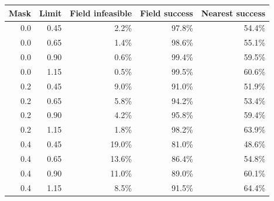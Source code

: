 \begin{tabular}{rrrrr}\toprule
Mask & Limit & Field infeasible & Field success & Nearest success\\
\midrule
0.0 & 0.45 & 2.2\% & 97.8\% & 54.4\%\\
0.0 & 0.65 & 1.4\% & 98.6\% & 55.1\%\\
0.0 & 0.90 & 0.6\% & 99.4\% & 59.5\%\\
0.0 & 1.15 & 0.5\% & 99.5\% & 60.6\%\\
0.2 & 0.45 & 9.0\% & 91.0\% & 51.9\%\\
0.2 & 0.65 & 5.8\% & 94.2\% & 53.4\%\\
0.2 & 0.90 & 4.2\% & 95.8\% & 59.4\%\\
0.2 & 1.15 & 1.8\% & 98.2\% & 63.9\%\\
0.4 & 0.45 & 19.0\% & 81.0\% & 48.6\%\\
0.4 & 0.65 & 13.6\% & 86.4\% & 54.8\%\\
0.4 & 0.90 & 11.0\% & 89.0\% & 60.1\%\\
0.4 & 1.15 & 8.5\% & 91.5\% & 64.4\%\\
\bottomrule\end{tabular}
